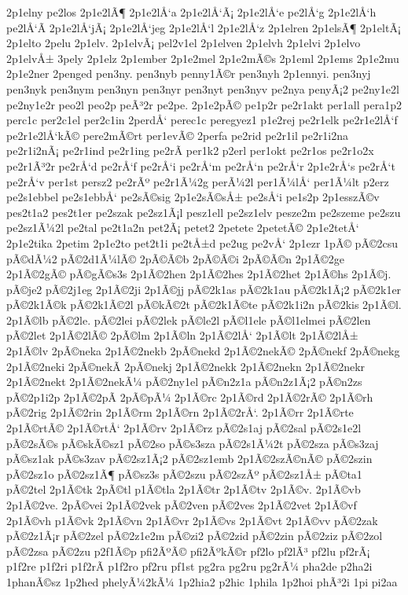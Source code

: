 {2p1elny
pe2los
2p1e2lÃ¶
2p1e2lÅ‘a
2p1e2lÅ‘Ã¡
2p1e2lÅ‘e
pe2lÅ‘g
2p1e2lÅ‘h
pe2lÅ‘Ã­
2p1e2lÅ‘jÃ¡
2p1e2lÅ‘jeg
2p1e2lÅ‘l
2p1e2lÅ‘z
2p1elren
2p1elsÃ¶
2p1eltÃ¡
2p1elto
2pelu
2p1elv.
2p1elvÃ¡
pel2v1el
2p1elven
2p1elvh
2p1elvi
2p1elvo
2p1elvÅ±
3pely
2p1elz
2p1ember
2p1e2mel
2p1e2mÃ©s
2p1eml
2p1ems
2p1e2mu
2p1e2ner
2penged
pen3ny.
pen3nyb
penny1Ã©r
pen3nyh
2p1ennyi.
pen3nyj
pen3nyk
pen3nym
pen3nyn
pen3nyr
pen3nyt
pen3nyv
pe2nya
penyÃ¡2
pe2ny1e2l
pe2ny1e2r
peo2l
peo2p
peÃ³2r
pe2pe.
2p1e2pÃ©
pe1p2r
pe2r1akt
per1all
pera1p2
perc1c
per2c1el
per2c1in
2perdÅ‘
perec1c
peregyez1
p1e2rej
pe2r1elk
pe2r1e2lÅ‘f
pe2r1e2lÅ‘kÃ©
pere2mÃ©rt
per1evÃ©
2perfa
pe2rid
pe2r1il
pe2r1i2na
pe2r1i2nÃ¡
pe2r1ind
pe2r1ing
pe2rÃ­
per1k2
p2erl
per1okt
pe2r1os
pe2r1o2x
pe2r1Ã³2r
pe2rÅ‘d
pe2rÅ‘f
pe2rÅ‘i
pe2rÅ‘m
pe2rÅ‘n
pe2rÅ‘r
2p1e2rÅ‘s
pe2rÅ‘t
pe2rÅ‘v
per1st
persz2
pe2rÃº
pe2r1Ã¼2g
perÃ¼2l
per1Ã¼lÅ‘
per1Ã¼lt
p2erz
pe2s1ebbel
pe2s1ebbÅ‘
pe2sÃ©sig
2p1e2sÃ©sÅ±
pe2sÅ‘i
pe1s2p
2p1esszÃ©v
pes2t1a2
pes2t1er
pe2szak
pe2sz1Ã¡l
pesz1ell
pe2sz1elv
pesze2m
pe2szeme
pe2szu
pe2sz1Ã¼2l
pe2tal
pe2t1a2n
pet2Ã¡
petet2
2petete
2petetÃ©
2p1e2tetÅ‘
2p1e2tika
2petim
2p1e2to
pet2t1i
pe2tÅ±d
pe2ug
pe2vÅ‘
2p1ezr
1pÃ©
pÃ©2csu
pÃ©dÃ¼2
pÃ©2d1Ã¼lÃ©
2pÃ©Ã©b
2pÃ©Ã©i
2pÃ©Ã©n
2p1Ã©2ge
2p1Ã©2gÃ©
pÃ©gÃ©s3s
2p1Ã©2hen
2p1Ã©2hes
2p1Ã©2het
2p1Ã©hs
2p1Ã©j.
pÃ©je2
pÃ©2j1eg
2p1Ã©2ji
2p1Ã©jj
pÃ©2k1as
pÃ©2k1au
pÃ©2k1Ã¡2
pÃ©2k1er
pÃ©2k1Ã©k
pÃ©2k1Ã©2l
pÃ©kÃ©2t
pÃ©2k1Ã©te
pÃ©2k1i2n
pÃ©2kis
2p1Ã©l.
2p1Ã©lb
pÃ©2le.
pÃ©2lei
pÃ©2lek
pÃ©le2l
pÃ©l1ele
pÃ©l1elmei
pÃ©2len
pÃ©2let
2p1Ã©2lÃ©
2pÃ©lm
2p1Ã©ln
2p1Ã©2lÅ‘
2p1Ã©lt
2p1Ã©2lÅ±
2p1Ã©lv
2pÃ©neka
2p1Ã©2nekb
2pÃ©nekd
2p1Ã©2nekÃ©
2pÃ©nekf
2pÃ©nekg
2p1Ã©2neki
2pÃ©nekÃ­
2pÃ©nekj
2p1Ã©2nekk
2p1Ã©2nekn
2p1Ã©2nekr
2p1Ã©2nekt
2p1Ã©2nekÃ¼
pÃ©2ny1el
pÃ©n2z1a
pÃ©n2z1Ã¡2
pÃ©n2zs
pÃ©2p1i2p
2p1Ã©2pÃ­
2pÃ©pÃ¼
2p1Ã©rc
2p1Ã©rd
2p1Ã©2rÃ©
2p1Ã©rh
pÃ©2rig
2p1Ã©2rin
2p1Ã©rm
2p1Ã©rn
2p1Ã©2rÅ‘.
2p1Ã©rr
2p1Ã©rte
2p1Ã©rtÃ©
2p1Ã©rtÅ‘
2p1Ã©rv
2p1Ã©rz
pÃ©2s1aj
pÃ©2sal
pÃ©2s1e2l
pÃ©2sÃ©s
pÃ©skÃ©sz1
pÃ©2so
pÃ©s3sza
pÃ©2s1Ã¼2t
pÃ©2sza
pÃ©s3zaj
pÃ©sz1ak
pÃ©s3zav
pÃ©2sz1Ã¡2
pÃ©2sz1emb
2p1Ã©2szÃ©nÃ©
pÃ©2szin
pÃ©2sz1o
pÃ©2sz1Ã¶
pÃ©sz3s
pÃ©2szu
pÃ©2szÃº
pÃ©2sz1Å±
pÃ©ta1
pÃ©2tel
2p1Ã©tk
2pÃ©tl
p1Ã©tla
2p1Ã©tr
2p1Ã©tv
2p1Ã©v.
2p1Ã©vb
2p1Ã©2ve.
2pÃ©vei
2p1Ã©2vek
pÃ©2ven
pÃ©2ves
2p1Ã©2vet
2p1Ã©vf
2p1Ã©vh
p1Ã©vk
2p1Ã©vn
2p1Ã©vr
2p1Ã©vs
2p1Ã©vt
2p1Ã©vv
pÃ©2zak
pÃ©2z1Ã¡r
pÃ©2zel
pÃ©2z1e2m
pÃ©zi2
pÃ©2zid
pÃ©2zin
pÃ©2ziz
pÃ©2zol
pÃ©2zsa
pÃ©2zu
p2f1Ã©p
pfi2ÃºÃ©
pfi2ÃºkÃ©r
pf2lo
pf2lÃ³
pf2lu
pf2rÃ¡
p1f2re
p1f2ri
p1f2rÃ­
p1f2ro
pf2ru
pf1st
pg2ra
pg2ru
pg2rÃ¼
pha2de
p2ha2i
1phanÃ©sz
1p2hed
phelyÃ¼2kÃ¼
1p2hia2
p2hic
1phila
1p2hoi
phÃ³2i
1pi
pi2aa
}

